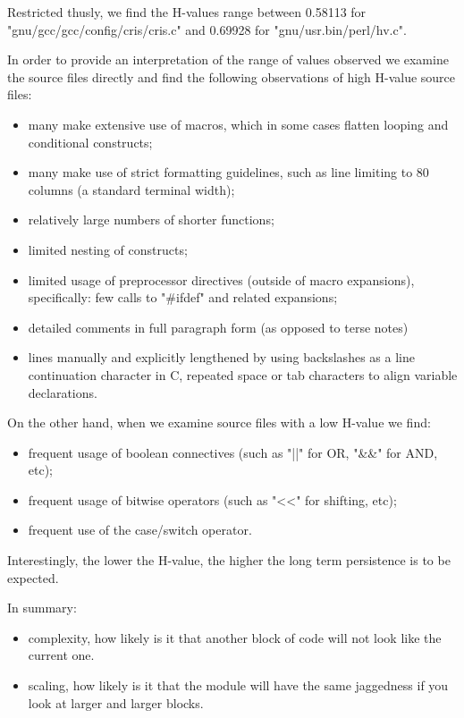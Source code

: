 \documentclass[12pt]{article}
\begin{document}
Restricted thusly, we find the H-values range between 0.58113 for "gnu/gcc/gcc/config/cris/cris.c" and 0.69928 for "gnu/usr.bin/perl/hv.c".

In order to provide an interpretation of the range of values observed we examine the source files directly and find the following observations of high H-value source files:

\begin{itemize}
\item many make extensive use of macros, which in some cases flatten looping and conditional constructs;
\item many make use of strict formatting guidelines, such as line limiting to 80 columns (a standard terminal width);
\item relatively large numbers of shorter functions;
\item limited nesting of constructs;
\item limited usage of preprocessor directives (outside of macro expansions), specifically: few calls to "\#ifdef" and related expansions;
\item detailed comments in full paragraph form (as opposed to terse notes)
\item lines manually and explicitly lengthened by using backslashes as a line continuation character in C, repeated space or tab characters to align variable declarations.
\end{itemize}

On the other hand, when we examine source files with a low H-value we find:
\begin{itemize}
\item frequent usage of boolean connectives (such as "||" for OR, "\&\&" for AND, etc);
\item frequent usage of bitwise operators (such as "<<" for shifting, etc);
\item frequent use of the case/switch operator.

\end{itemize}

Interestingly, the lower the H-value, the higher the long term persistence is to be expected.

In summary:
\begin{itemize}
\item complexity, how likely is it that another block of code will not look like the current one.
\item scaling, how likely is it that the module will have the same jaggedness if you look at larger and larger blocks.
\end{itemize}
\end{document}
